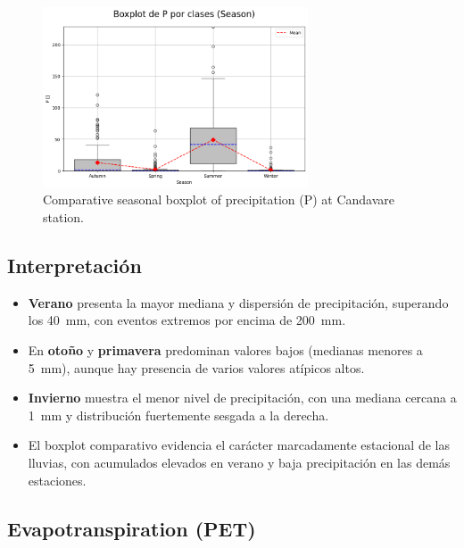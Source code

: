 \vspace{0.2cm}

\begin{figure}[htbp]
\centering
\includegraphics[width=0.7\textwidth]{resultados/por_estacion_del_anio/boxplot_clases_por_estacion/Candavare/P_ClassBoxplot_Season.png}
\caption{Comparative seasonal boxplot of precipitation (P) at Candavare station.}
\label{fig:candavare_p_box}
\end{figure}

\subsection*{Interpretación}

\begin{itemize}
    \item \textbf{Verano} presenta la mayor mediana y dispersión de precipitación, superando los 40~mm, con eventos extremos por encima de 200~mm.
    \item En \textbf{otoño} y \textbf{primavera} predominan valores bajos (medianas menores a 5~mm), aunque hay presencia de varios valores atípicos altos.
    \item \textbf{Invierno} muestra el menor nivel de precipitación, con una mediana cercana a 1~mm y distribución fuertemente sesgada a la derecha.
    \item El boxplot comparativo evidencia el carácter marcadamente estacional de las lluvias, con acumulados elevados en verano y baja precipitación en las demás estaciones.
\end{itemize}

\subsection{Evapotranspiration (PET)}

